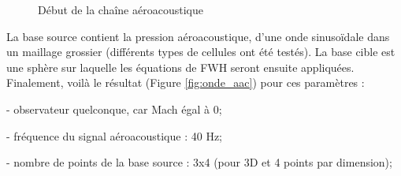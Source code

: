 \begin{figure}[H]
\begin{subfigure}[b]{\textwidth}
    \end{subfigure}
    \caption{Début de la chaîne aéroacoustique}
    \label{fig:composite}
\end{figure}






La base source contient la pression aéroacoustique, d'une onde sinusoïdale dans un maillage grossier (différents types de cellules ont été testés). La base cible est une sphère sur laquelle les équations de FWH seront ensuite appliquées. Finalement, voilà le résultat (Figure \ref{fig:onde_aac}) pour ces paramètres :

- observateur quelconque, car Mach égal à 0;

\vspace{-0,2cm}
- fréquence du signal aéroacoustique : 40 Hz;

\vspace{-0,2cm}
- nombre de points de la base source : 3x4 (pour 3D et 4 points par dimension);

